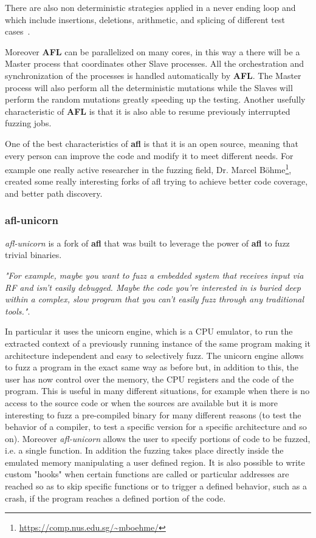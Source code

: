 \documentclass[../main.tex]{subfiles}
\begin{document}
There are also non deterministic strategies applied in a never ending loop and which include insertions, deletions, arithmetic, and splicing of different test cases~\cite{afltech}.

Moreover \textbf{AFL} can be parallelized on many cores, in this way a there will be a Master process that coordinates other Slave processes. All the orchestration and synchronization of the processes is handled automatically by \textbf{AFL}. The Master process will also perform all the deterministic mutations while the Slaves will perform the random mutations greatly speeding up the testing. Another usefully characteristic of \textbf{AFL} is that it is also able to resume previously interrupted fuzzing jobs.

One of the best characteristics of \textbf{\acrshort{afl}} is that it is an open source, meaning that every person can improve the code and modify it to meet different needs. For example one really active researcher in the fuzzing field, Dr. Marcel B\"ohme\footnote{\url{https://comp.nus.edu.sg/~mboehme/}}, created some really interesting forks of afl trying to achieve better code coverage\cite{aflfast}\cite{greybf}, and better path discovery\cite{pythia}.

\subsubsection{afl-unicorn}
\label{sub:afl-unicorn}

\textit{afl-unicorn} is a fork of \textbf{\acrshort{afl}}  that was built to leverage the power of \textbf{\acrshort{afl}} to fuzz trivial binaries.

\textit{"For example, maybe you want to fuzz a embedded system that receives input via RF and isn’t easily debugged. Maybe the code you’re interested in is buried deep within a complex, slow program that you can’t easily fuzz through any traditional tools."}\cite{aflunicorn}.

In particular it uses the unicorn engine\cite{unicorn}, which is a CPU emulator, to run the extracted context of a previously running instance of the same program making it architecture independent and easy to selectively fuzz. The unicorn engine allows to fuzz a program in the exact same way as before but, in addition to this, the user has now control over the memory, the CPU registers and the code of the program. This is useful in many different situations, for example when there is no access to the source code or when the sources are available but it is more interesting to fuzz a pre-compiled binary for many different reasons (to test the behavior of a compiler, to test a specific version for a specific architecture and so on). Moreover \textit{afl-unicorn} allows the user to specify portions of code to be fuzzed, i.e. a single function. In addition the fuzzing takes place directly inside the emulated memory manipulating a user defined region. It is also possible to write custom "hooks" when certain functions are called or particular addresses are reached so as to skip specific functions or to trigger a defined behavior, such as a crash, if the program reaches a defined portion of the code.
\end{document}
